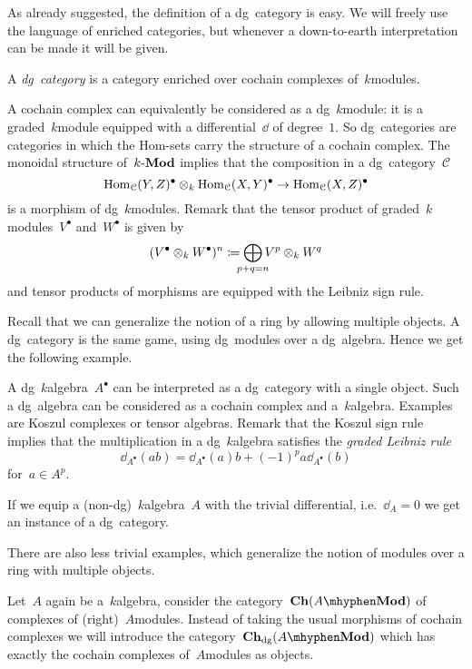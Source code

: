 \begin{refsection}
As already suggested, the definition of a dg~category is easy. We will freely use the language of enriched categories, but whenever a down-to-earth interpretation can be made it will be given.
\begin{definition}
  \label{definition:dg-category-enriched}
  A \emph{dg~category} is a category enriched over cochain complexes of~$k$\dash modules.
\end{definition}
A cochain complex can equivalently be considered as a dg~$k$\dash module: it is a graded~$k$\dash module equipped with a differential~$\dd$ of degree~$1$. So dg~categories are categories in which the Hom-sets carry the structure of a cochain complex. The monoidal structure of~$k\textrm{-}\mathbf{Mod}$ implies that the composition in a dg~category~$\mathcal{C}$
\begin{equation}
  \mathrm{Hom}_{\mathcal{C}}(Y,Z)^\bullet\otimes_k\mathrm{Hom}_{\mathcal{C}}(X,Y)^\bullet\to\mathrm{Hom}_{\mathcal{C}}(X,Z)^\bullet
\end{equation}
is a morphism of dg~$k$\dash modules. Remark that the tensor product of graded~$k$\dash modules~$V^\bullet$ and~$W^\bullet$ is given by
\begin{equation}
  (V^\bullet\otimes_k W^\bullet)^n\coloneqq\bigoplus_{\mathclap{p+q=n}}V^p\otimes_k W^q
\end{equation}
and tensor products of morphisms are equipped with the Leibniz sign rule.

Recall that we can generalize the notion of a ring by allowing multiple objects. A dg~category is the same game, using dg~modules over a dg~algebra. Hence we get the following example.
\begin{example}
  \label{example:dg-category-of-algebra}
  A dg~$k$\dash algebra~$A^\bullet$ can be interpreted as a dg~category with a single object. Such a dg~algebra can be considered as a cochain complex and a~$k$\dash algebra. Examples are Koszul complexes or tensor algebras. Remark that the Koszul sign rule implies that the multiplication in a dg~$k$\dash algebra satisfies the \emph{graded Leibniz rule}
  \begin{equation}
    \dd_{A^\bullet}(ab)=\dd_{A^\bullet}(a)b+(-1)^pa\dd_{A^\bullet}(b)
  \end{equation}
  for~$a\in A^p$.
  
  If we equip a (non-dg)~$k$\dash algebra~$A$ with the trivial differential, i.e.\ $\dd_A=0$ we get an instance of a dg~category.
\end{example}
There are also less trivial examples, which generalize the notion of modules over a ring with multiple objects.
\begin{example}
  \label{example:Ch-dg(A-mod)}
  Let~$A$ again be a~$k$\dash algebra, consider the category~$\Ch(A\mhyphen\Mod)$ of complexes of (right)~$A$\dash modules. Instead of taking the usual morphisms of cochain complexes we will introduce the category~$\Ch_\dg(A\mhyphen\Mod)$ which has exactly the cochain complexes of~$A$\dash modules as objects.
  

\end{example}
\end{refsection}
